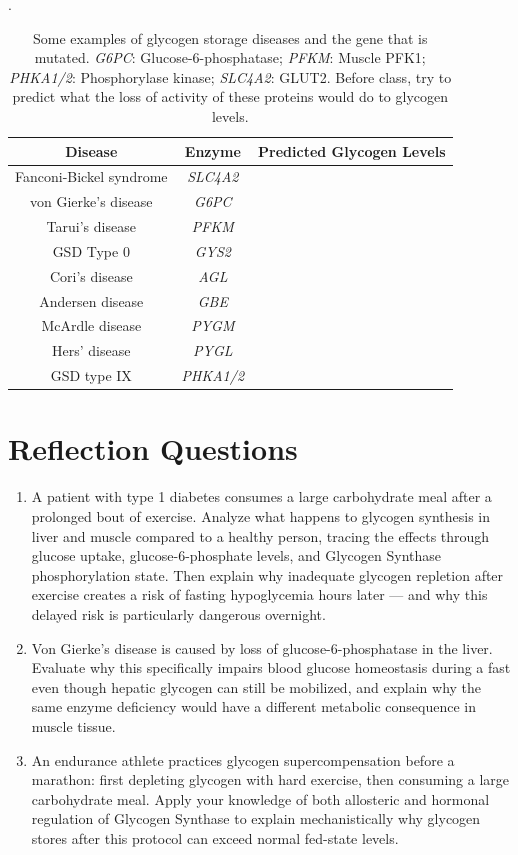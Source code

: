 \documentclass{tufte-handout}
\begin{document}
\begin{table}
\centering
\caption{Some examples of glycogen storage diseases and the gene that is mutated.  \textit{G6PC}: Glucose-6-phosphatase; \textit{PFKM}: Muscle PFK1; \textit{PHKA1/2}: Phosphorylase kinase; \textit{SLC4A2}: GLUT2.  Before class, try to predict what the loss of activity of these proteins would do to glycogen levels.}.
\label{tab:glycogen-storage-diseases}
\begin{tabular}{ccc}
\hline
\textbf {Disease} & \textbf{Enzyme} & \textbf{Predicted Glycogen Levels} \\
\hline
Fanconi-Bickel syndrome & \textit{SLC4A2} & \\
von Gierke's disease & \textit{G6PC} & \\
Tarui's disease & \textit{PFKM} & \\
GSD Type 0 & \textit{GYS2} & \\
Cori's disease & \textit{AGL} & \\
Andersen disease & \textit{GBE} & \\
McArdle disease& \textit{PYGM} & \\
Hers' disease & \textit{PYGL} & \\
GSD type IX & \textit{PHKA1/2} & \\
\hline
\end{tabular}
\end{table}



\section{Reflection Questions}
\begin{enumerate}
\item A patient with type 1 diabetes consumes a large carbohydrate meal after a prolonged bout of exercise. Analyze what happens to glycogen synthesis in liver and muscle compared to a healthy person, tracing the effects through glucose uptake, glucose-6-phosphate levels, and Glycogen Synthase phosphorylation state. Then explain why inadequate glycogen repletion after exercise creates a risk of fasting hypoglycemia hours later --- and why this delayed risk is particularly dangerous overnight.
\item Von Gierke's disease is caused by loss of glucose-6-phosphatase in the liver. Evaluate why this specifically impairs blood glucose homeostasis during a fast even though hepatic glycogen can still be mobilized, and explain why the same enzyme deficiency would have a different metabolic consequence in muscle tissue.
\item An endurance athlete practices glycogen supercompensation before a marathon: first depleting glycogen with hard exercise, then consuming a large carbohydrate meal. Apply your knowledge of both allosteric and hormonal regulation of Glycogen Synthase to explain mechanistically why glycogen stores after this protocol can exceed normal fed-state levels.
\end{enumerate}



\end{document}
